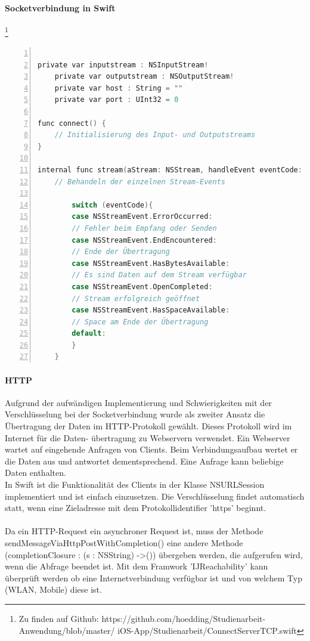 \paragraph{Socketverbindung in Swift}\footnote{Zu finden auf Github: https://github.com/hoedding/Studienarbeit-Anwendung/blob/master/ iOS-App/Studienarbeit/ConnectServerTCP.swift}
\begin{lstlisting}[caption =Implementierung einer Socketverbindung in Swift (Schematische Darstellung), language=C, frame=single, breaklines=true,columns=fullflexible, commentstyle=\color{gray}\upshape, captionpos=b, numbers = left]

private var inputstream : NSInputStream!
    private var outputstream : NSOutputStream!
    private var host : String = ""
    private var port : UInt32 = 0

func connect() {        
	// Initialisierung des Input- und Outputstreams
}

internal func stream(aStream: NSStream, handleEvent eventCode: NSStreamEvent) {
	// Behandeln der einzelnen Stream-Events

        switch (eventCode){
        case NSStreamEvent.ErrorOccurred:
		// Fehler beim Empfang oder Senden
        case NSStreamEvent.EndEncountered:
		// Ende der Übertragung
        case NSStreamEvent.HasBytesAvailable:
		// Es sind Daten auf dem Stream verfügbar
        case NSStreamEvent.OpenCompleted:
		// Stream erfolgreich geöffnet
        case NSStreamEvent.HasSpaceAvailable:
		// Space am Ende der Übertragung
        default:
        }
    }

\end{lstlisting}


\paragraph{HTTP}
Aufgrund der aufwändigen Implementierung und Schwierigkeiten mit der Verschlüsselung bei der Socketverbindung wurde als zweiter Ansatz die Übertragung der Daten im HTTP-Protokoll gewählt. Dieses Protokoll wird im Internet für die Daten- übertragung zu Webservern verwendet. Ein Webserver wartet auf eingehende Anfragen von Clients. Beim Verbindungsaufbau wertet er die Daten aus und antwortet dementsprechend. Eine Anfrage kann beliebige Daten enthalten. \\
In Swift ist die Funktionalität des Clients in der Klasse NSURLSession implementiert und ist einfach einzusetzen. Die Verschlüsselung findet automatisch statt, wenn eine Zieladresse mit dem Protokollidentifier 'https' beginnt.\\\\
Da ein HTTP-Request ein asynchroner Request ist, muss der Methode sendMessageViaHttpPostWithCompletion() eine andere Methode (completionClosure : (s : NSString) -\textgreater ()) übergeben werden, die aufgerufen wird, wenn die Abfrage beendet ist. Mit dem Framwork 'IJReachability' kann überprüft werden ob eine Internetverbindung verfügbar ist und von welchem Typ (WLAN, Mobile) diese ist. 

